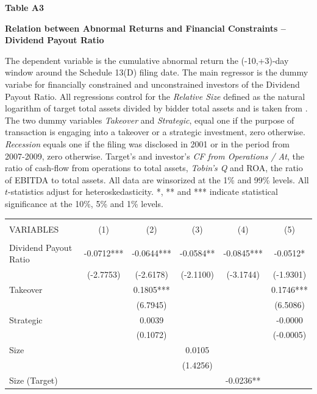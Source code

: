 \documentclass[12pt]{article}
\begin{document}
\begin{appendices}
\begin{table}[!htbp]
	\centering
	\textbf{Table A3}\par\medskip
	\large\textbf{Relation between Abnormal Returns and Financial Constraints -- Dividend Payout Ratio}\par\medskip
	\justifying
	\footnotesize\noindent{} The dependent variable is the cumulative abnormal return the (-10,+3)-day window around the Schedule 13(D) filing date. The main regressor is the dummy variabe for financially constrained and unconstrained investors of the Dividend Payout Ratio. All regressions control for the \emph{Relative Size} defined as the natural logarithm of target total assets divided by bidder total assets and is taken from \citet[p.112]{Khatami2014}. The two dummy variables \emph{Takeover} and \emph{Strategic}, equal one if the purpose of transaction is engaging into a takeover or a strategic investment, zero otherwise. \emph{Recession} equals one if the filing was disclosed in 2001 or in the period from 2007-2009, zero otherwise. Target's and investor's \emph{CF from Operations / At}, the ratio of cash-flow from operations to total assets, \emph{Tobin's Q} and ROA, the ratio of EBITDA to total assets. All data are winsorized at the 1\% and 99\% levels. All $t$-statistics adjust for heteroskedasticity. *, ** and *** indicate statistical significance at the 10\%, 5\% and 1\% levels.\par\medskip
	\begin{adjustbox}{max width=\textwidth}
		\begin{tabular}{lccccc} \hline
			\\
		   VARIABLES & (1) & (2) & (3) & (4) & (5) \\\hline
			&  &  &  &  &  \\
		   Dividend Payout Ratio & -0.0712*** & -0.0644*** & -0.0584** & -0.0845*** & -0.0512* \\
			& (-2.7753) & (-2.6178) & (-2.1100) & (-3.1744) & (-1.9301) \\
		   Takeover &  & 0.1805*** &  &  & 0.1746*** \\
			&  & (6.7945) &  &  & (6.5086) \\
		   Strategic &  & 0.0039 &  &  & -0.0000 \\
			&  & (0.1072) &  &  & (-0.0005) \\
		   Size &  &  & 0.0105 &  &  \\
			&  &  & (1.4256) &  &  \\
		   Size (Target) &  &  &  & -0.0236** &  \\

\end{tabular}
\end{adjustbox}
\end{table}
\end{appendices}
\end{document}
